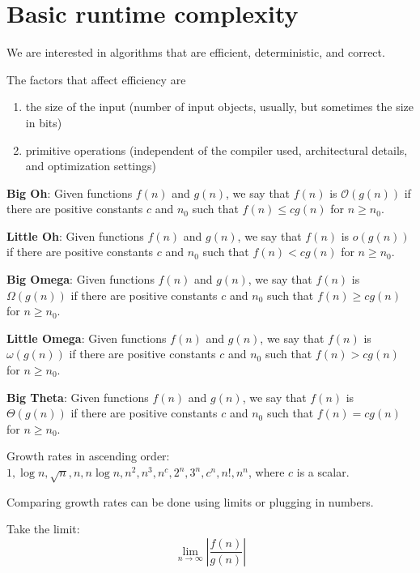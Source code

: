 \documentclass{article}
\newcommand{\Oh}{\mathcal{O}}
\begin{document}

\section{Basic runtime complexity}
We are interested in algorithms that are efficient, deterministic, and correct.

The factors that affect efficiency are
\begin{enumerate}
    \item the size of the input (number of input objects, usually, but sometimes the size in bits)
    \item primitive operations (independent of the compiler used, architectural details, and optimization settings)
\end{enumerate}

\textbf{Big Oh}: Given functions $f(n)$ and $g(n)$, we say that $f(n)$ is $\Oh(g(n))$ if there are positive constants $c$ and $n_0$ such that $f(n) \leq cg(n)$ for $n \geq n_0$.

\textbf{Little Oh}: Given functions $f(n)$ and $g(n)$, we say that $f(n)$ is $o(g(n))$ if there are positive constants $c$ and $n_0$ such that $f(n) < cg(n)$ for $n \geq n_0$.

\textbf{Big Omega}: Given functions $f(n)$ and $g(n)$, we say that $f(n)$ is $\Omega(g(n))$ if there are positive constants $c$ and $n_0$ such that $f(n) \geq cg(n)$ for $n \geq n_0$.

\textbf{Little Omega}: Given functions $f(n)$ and $g(n)$, we say that $f(n)$ is $\omega(g(n))$ if there are positive constants $c$ and $n_0$ such that $f(n) > cg(n)$ for $n \geq n_0$.

\textbf{Big Theta}: Given functions $f(n)$ and $g(n)$, we say that $f(n)$ is $\Theta(g(n))$ if there are positive constants $c$ and $n_0$ such that $f(n) = cg(n)$ for $n \geq n_0$.

Growth rates in ascending order: $1, \log n, \sqrt{n}, n, n \log n, n^2, n^3, n^c, 2^n, 3^n, c^n, n!, n^n$, where $c$ is a scalar.

Comparing growth rates can be done using limits or plugging in numbers.

Take the limit: $$\lim_{n \to \infty} \left|\frac{f(n)}{g(n)}\right|$$
\end{document}
